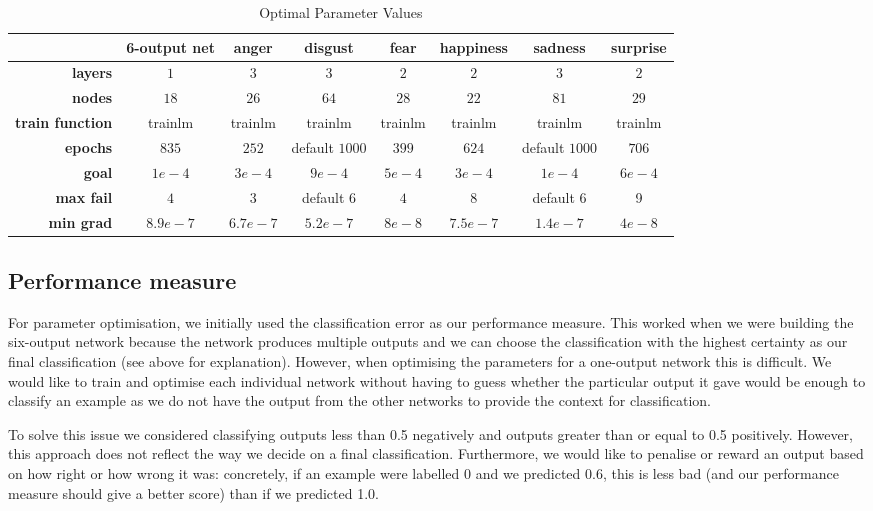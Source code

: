 \documentclass[10pt,a4paper]{article}
\begin{document}
\begin{table}
\centering
\begin{tabular}{|r|c||c|c|c|c|c|c|}
\hline 
 & \textbf{6-output net} & \textbf{anger} & \textbf{disgust} & \textbf{fear} & \textbf{happiness} & \textbf{sadness} & \textbf{surprise} \\ 
\hline 
\textbf{layers} & $1$ & $3$ & $3$ & $2$ & $2$ & $3$ & $2$ \\ 
\hline 
\textbf{nodes} & $18$ & $26$ & $64$ & $28$ & $22$ & $81$ & $29$ \\ 
\hline 
\textbf{train function} & trainlm & trainlm & trainlm & trainlm & trainlm & trainlm & trainlm\\
\hline 
\textbf{epochs} & $835$ & $252$ & default $1000$ & $399$ & $624$ & default $1000$ & $706$ \\ 
\hline 
\textbf{goal} & $1e-4$ & $3e-4$ & $9e-4$ & $5e-4$ & $3e-4$ & $1e-4$ & $6e-4$ \\ 
\hline 
\textbf{max fail} & $4$ & $3$ & default $6$ & $4$ & $8$ & default $6$ & 9 \\ 
\hline 
\textbf{min grad} & $8.9e-7$ & $6.7e-7$ & $5.2e-7$ & $8e-8$ & $7.5e-7$ & $1.4e-7$ & $4e-8$ \\ 
\hline 
\end{tabular} 
\caption{Optimal Parameter Values}
\label{tab:optimalValues}
\end{table}

\subsection{Performance measure}
For parameter optimisation, we initially used the classification error as our performance measure. This worked when we were building the six-output network because the network produces multiple outputs and we can choose the classification with the highest certainty as our final classification (see above for explanation). However, when optimising the parameters for a one-output network this is difficult. We would like to train and optimise each individual network without having to guess whether the particular output it gave would be enough to classify an example as we do not have the output from the other networks to provide the context for classification. 

To solve this issue we considered classifying outputs less than 0.5 negatively and outputs greater than or equal to 0.5 positively. However, this approach does not reflect the way we decide on a final classification. Furthermore, we would like to penalise or reward an output based on how right or how wrong it was: concretely, if an example were labelled 0 and we predicted 0.6, this is less bad (and our performance measure should give a better score) than if we predicted 1.0. 
\end{document}
